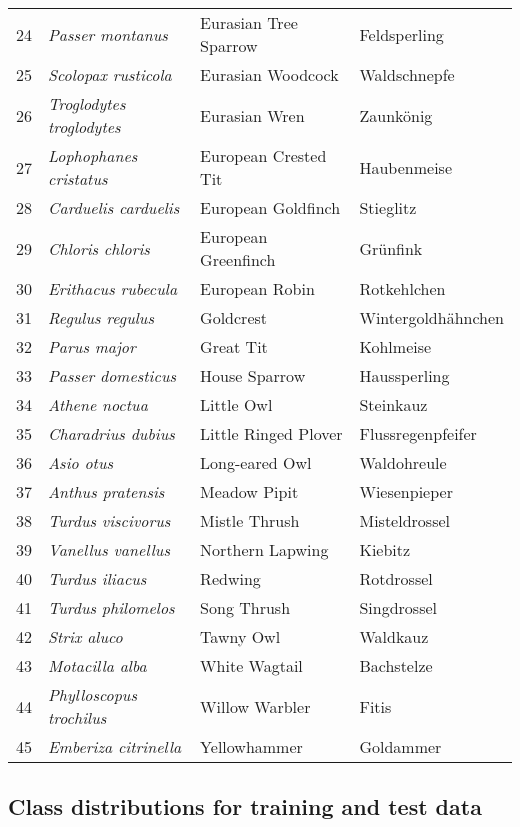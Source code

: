 \begin{longtable}{clll}
    24 & \textit{Passer montanus} & Eurasian Tree Sparrow & Feldsperling \\
    25 & \textit{Scolopax rusticola} & Eurasian Woodcock & Waldschnepfe \\
    26 & \textit{Troglodytes troglodytes} & Eurasian Wren & Zaunkönig \\
    27 & \textit{Lophophanes cristatus} & European Crested Tit & Haubenmeise \\
    28 & \textit{Carduelis carduelis} & European Goldfinch & Stieglitz \\
    29 & \textit{Chloris chloris} & European Greenfinch & Grünfink \\
    30 & \textit{Erithacus rubecula} & European Robin & Rotkehlchen \\
    31 & \textit{Regulus regulus} & Goldcrest & Wintergoldhähnchen \\
    32 & \textit{Parus major} & Great Tit & Kohlmeise \\
    33 & \textit{Passer domesticus} & House Sparrow & Haussperling \\
    34 & \textit{Athene noctua} & Little Owl & Steinkauz \\
    35 & \textit{Charadrius dubius} & Little Ringed Plover & Flussregenpfeifer \\
    36 & \textit{Asio otus} & Long-eared Owl & Waldohreule \\
    37 & \textit{Anthus pratensis} & Meadow Pipit & Wiesenpieper \\
    38 & \textit{Turdus viscivorus} & Mistle Thrush & Misteldrossel \\
    39 & \textit{Vanellus vanellus} & Northern Lapwing & Kiebitz \\
    40 & \textit{Turdus iliacus} & Redwing & Rotdrossel \\
    41 & \textit{Turdus philomelos} & Song Thrush & Singdrossel \\
    42 & \textit{Strix aluco} & Tawny Owl & Waldkauz \\
    43 & \textit{Motacilla alba} & White Wagtail & Bachstelze \\
    44 & \textit{Phylloscopus trochilus} & Willow Warbler & Fitis \\
    45 & \textit{Emberiza citrinella} & Yellowhammer & Goldammer \\
    \end{longtable}

\subsection{Class distributions for training and test data}
\label{sec:Appendix2}

